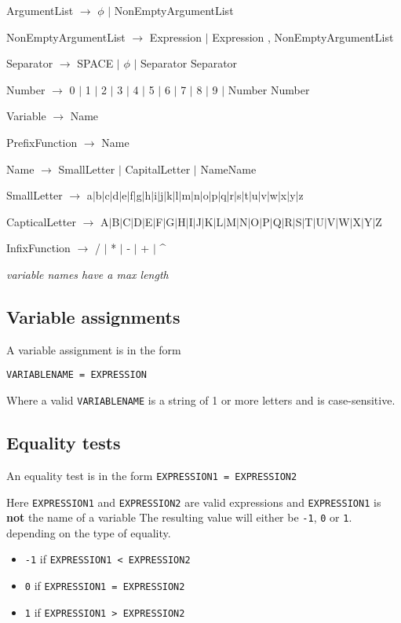 \documentclass[11pt,a4paper]{article}
\begin{document}
ArgumentList \(\rightarrow\) \(\phi\) $\mid$  NonEmptyArgumentList

NonEmptyArgumentList  \(\rightarrow\)  Expression $\mid$ Expression , NonEmptyArgumentList

Separator \(\rightarrow\) SPACE $\mid$ \(\phi\) $\mid$ Separator Separator

Number \(\rightarrow\) 0 $\mid$ 1 $\mid$ 2 $\mid$ 3 $\mid$ 4 $\mid$ 5 $\mid$ 6 $\mid$ 7 $\mid$ 8 $\mid$ 9 $\mid$ Number Number

Variable \(\rightarrow\) Name

PrefixFunction \(\rightarrow\) Name

Name \(\rightarrow\) SmallLetter $\mid$ CapitalLetter $\mid$ NameName

SmallLetter \(\rightarrow\) a$\mid$b$\mid$c$\mid$d$\mid$e$\mid$f$\mid$g$\mid$h$\mid$i$\mid$j$\mid$k$\mid$l$\mid$m$\mid$n$\mid$o$\mid$p$\mid$q$\mid$r$\mid$s$\mid$t$\mid$u$\mid$v$\mid$w$\mid$x$\mid$y$\mid$z

CapticalLetter \(\rightarrow\) A$\mid$B$\mid$C$\mid$D$\mid$E$\mid$F$\mid$G$\mid$H$\mid$I$\mid$J$\mid$K$\mid$L$\mid$M$\mid$N$\mid$O$\mid$P$\mid$Q$\mid$R$\mid$S$\mid$T$\mid$U$\mid$V$\mid$W$\mid$X$\mid$Y$\mid$Z

InfixFunction \(\rightarrow\) / $\mid$ * $\mid$ - $\mid$ + $\mid$ \^{}

\emph{variable names have a max length}


\subsection{Variable assignments}
A variable assignment is in the form

\texttt{VARIABLENAME = EXPRESSION}

Where a valid \texttt{VARIABLENAME} is a string of 1 or more letters and
is case-sensitive.
\subsection{Equality tests}
An equality test is in the form
\texttt{EXPRESSION1 = EXPRESSION2}


Here \texttt{EXPRESSION1} and \texttt{EXPRESSION2} are valid
expressions and \texttt{EXPRESSION1} is \textbf{not} the name of a
variable The resulting value will either be \texttt{-1}, \texttt{0} or
\texttt{1}. depending on the type of equality.

\begin{itemize}
\item \texttt{-1} if \texttt{EXPRESSION1 < EXPRESSION2}
\item \texttt{0} if \texttt{EXPRESSION1 = EXPRESSION2}
\item \texttt{1} if \texttt{EXPRESSION1 > EXPRESSION2}
\end{itemize}
\end{document}
